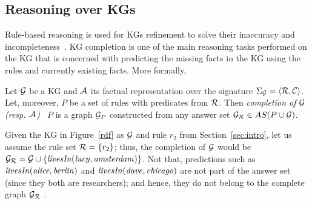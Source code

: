 \subsection{Reasoning over KGs} Rule-based reasoning is used for KGs refinement to solve their inaccuracy and incompleteness~\cite{DBLP:journals/semweb/Paulheim17}. KG completion is one of the main reasoning tasks performed on the KG that is concerned with predicting the missing facts in the KG using the rules and currently existing facts. More formally, 


 \begin{definition}\label{def:def:kgcomp} Let $\mathcal{G}$ be a KG and $\mathcal{A}$ its factual representation over the signature $\Sigma_{\mathcal{G}}=\langle\mathcal{R},\mathcal{C}\rangle$. Let, moreover, $P$ be a set of rules with predicates from $\mathcal{R}$. %
 Then \emph{completion of $\mathcal{G}$ (resp. $\mathcal{A}$) \wrt\ $P$} is a graph $\mathcal{G}_{P}$ constructed from any answer set $\mathcal{G}_{\mathcal{R}}\in AS(P \cup \mathcal{G})$. 
 \end{definition}
 
 \begin{example}
 Given the KG in Figure~\ref{rdf} as $\mathcal{G}$ and rule $r_2$ from Section~\ref{sec:intro}, let us assume the rule set $\mathcal{R}=\{r_2\}$; thus, the completion of $\mathcal{G}$ would be $\mathcal{G}_{\mathcal{R}}=\mathcal{G} \cup \{\mathit{livesIn(lucy,amsterdam)}\}$. Not that, predictions such as $\mathit{livesIn(alice, berlin)}$ and $\mathit{livesIn(dave, chicago)}$ are not part of the answer set (since they both are researchers); and hence, they do not belong to the complete graph $\mathcal{G}_{\mathcal{R}}$ .
 \end{example}



